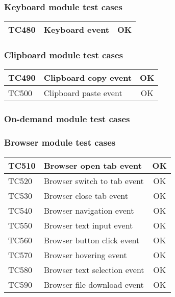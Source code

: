 \subsubsection*{Keyboard module test cases}

\begin{tabular}{|l|l|c|}
    \hline
    TC480 & Keyboard event & \cellcolor{green!25}OK \\ \hline
\end{tabular}

\subsubsection*{Clipboard module test cases}

\begin{tabular}{|l|l|c|}
    \hline
    TC490 & Clipboard copy event & \cellcolor{green!25}OK \\ \hline
    TC500 & Clipboard paste event & \cellcolor{green!25}OK \\ \hline
\end{tabular}

\subsubsection{On-demand module test cases}

\subsubsection*{Browser module test cases}

\begin{tabular}{|l|l|c|}
    \hline
    TC510 & Browser open tab event & \cellcolor{green!25}OK \\ \hline
    TC520 & Browser switch to tab event & \cellcolor{green!25}OK \\ \hline
    TC530 & Browser close tab event & \cellcolor{green!25}OK \\ \hline
    TC540 & Browser navigation event & \cellcolor{green!25}OK \\ \hline
    TC550 & Browser text input event & \cellcolor{green!25}OK \\ \hline
    TC560 & Browser button click event & \cellcolor{green!25}OK \\ \hline
    TC570 & Browser hovering event & \cellcolor{green!25}OK \\ \hline
    TC580 & Browser text selection event & \cellcolor{green!25}OK \\ \hline
    TC590 & Browser file download event & \cellcolor{green!25}OK \\ \hline
\end{tabular}